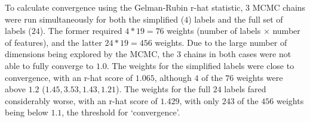 To calculate convergence using the Gelman-Rubin r-hat statistic, $3$ MCMC chains were run simultaneously for both the simplified ($4$) labels and the full set of labels ($24$). The former required $4*19=76$ weights (number of labels $\times$ number of features), and the latter $24*19=456$ weights. Due to the large number of dimensions being explored by the MCMC, the $3$ chains in both cases were not able to fully converge to $1.0$. The weights for the simplified labels were close to convergence, with an r-hat score of $1.065$, although $4$ of the $76$ weights were above $1.2$ ($1.45, 3.53, 1.43, 1.21$). The weights for the full $24$ labels fared considerably worse, with an r-hat score of $1.429$, with only $243$ of the $456$ weights being below $1.1$, the threshold for `convergence'.



